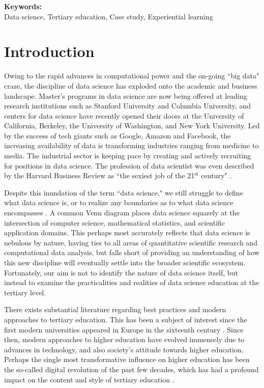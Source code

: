 \documentclass[12pt]{article}
\begin{document}
\vspace{0.4in}

\textbf{Keywords:} \\
\indent \indent Data science, Tertiary education, Case study, Experiential learning

\thispagestyle{empty}
\newpage

\section{Introduction}

Owing to the rapid advances in computational power and the on-going ``big data" craze, the discipline of data science has exploded onto the academic and business landscape. Master's programs in data science are now being offered at leading research institutions such as Stanford University and Columbia University, and centers for data science have recently opened their doors at the University of California, Berkeley, the University of Washington, and New York University. Led  by the success of tech giants such as Google, Amazon and Facebook, the increasing availability of data is transforming industries ranging from medicine to media.  The industrial sector is keeping pace by creating and actively recruiting for positions in data science.  The profession of data scientist was even described by the Harvard Business Review as ``the sexiest job of the 21$^{\text{st}}$ century" \citep{Patil2012}.

Despite this inundation of the term ``data science," we still struggle to define what data science is, or to realize any boundaries as to what data science encompasses \citep{Hayashi1998, Loukides2011, Provost2013}. A common Venn diagram places data science squarely at the intersection of computer science, mathematical statistics, and scientific application domains.  This perhaps most accurately reflects that data science is nebulous by nature, having ties to all areas of quantitative scientific research and computational data analysis, but falls short of providing an understanding of how this new discipline will eventually settle into the broader scientific ecosystem.  Fortunately, our aim is not to identify the nature of data science itself, but instead to examine the practicalities and realities of data science education at the tertiary level.

There exists substantial literature regarding best practices and modern approaches to tertiary education. This has been a subject of interest since the first modern universities appeared in Europe in the sixteenth century \citep{Rudy1984, Pedersen1997}.  Since then, modern approaches to higher education have evolved immensely due to advances in technology, and also society's attitude towards higher education.  Perhaps the single most transformative influence on higher education has been the so-called digital revolution of the past few decades, which has had a profound impact on the content and style of tertiary education \citep{Roberts1994, Ely1995, Baker1997, Wood2005, Baek2008}.
\end{document}
